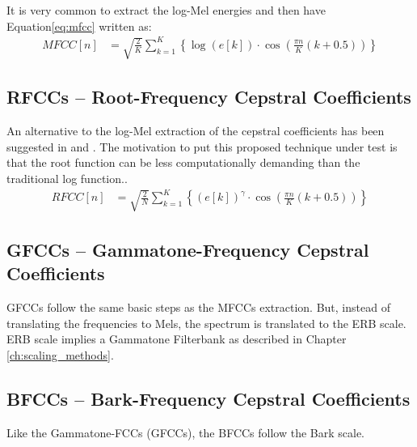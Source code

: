 It is very common to extract the log-Mel energies
and then have Equation\;\ref{eq:mfcc} written as:
\begin{align}\label{eq:logmfcc}
    MFCC[n] & = \sqrt{\frac{2}{K}} \sum_{k=1}^{K} \left\{ 
        \log \left( e[k] \right) \cdot \cos \left( \frac{\pi n}{K} (k+0.5) \right)
     \right\}
\end{align}


\subsection{RFCCs -- Root-Frequency Cepstral Coefficients}
An alternative to the log-Mel 
extraction of the cepstral coefficients
has been suggested in \cite{rmfcc1} and \cite{1415167}.
The motivation to put this proposed 
technique under test is that the root 
function can be less computationally demanding 
than the traditional log function..
\begin{align}
    RFCC[n] & = \sqrt{\frac{2}{N}} \sum_{k=1}^{K} \left\{ 
        \left( e[k] \right)^{\gamma} \cdot \cos \left( \frac{\pi n}{K} (k+0.5) \right)
     \right\}
\end{align}

\subsection{GFCCs -- Gammatone-Frequency Cepstral Coefficients}
GFCCs follow the same basic steps as the MFCCs extraction.
But, instead of translating the frequencies to Mels,
the spectrum is translated to the ERB scale.
ERB scale implies a Gammatone Filterbank as described in Chapter \ref{ch:scaling_methods}.


\subsection{BFCCs -- Bark-Frequency Cepstral Coefficients}
Like the Gammatone-FCCs (GFCCs), the BFCCs follow the Bark scale.

